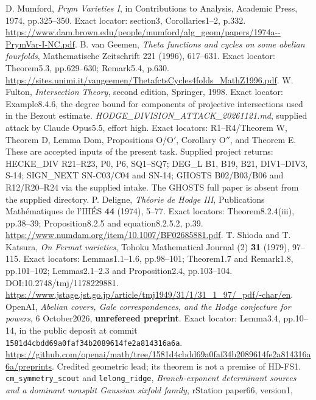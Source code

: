 D. Mumford, \emph{Prym Varieties I}, in Contributions to Analysis,
Academic Press, 1974, pp.325--350. Exact locator: section3,
Corollaries1--2, p.332.
\url{https://www.dam.brown.edu/people/mumford/alg_geom/papers/1974a--PrymVar-I-NC.pdf}.
B. van Geemen, \emph{Theta functions and cycles on some abelian fourfolds},
Mathematische Zeitschrift 221 (1996), 617--631.
Exact locator: Theorem5.3, pp.629--630; Remark5.4, p.630.
\url{https://sites.unimi.it/vangeemen/ThetafctsCycles4folds_MathZ1996.pdf}.
W. Fulton, \emph{Intersection Theory}, second edition, Springer, 1998.
Exact locator: Example8.4.6, the degree bound for components of
projective intersections used in the Bezout estimate.
\emph{HODGE\_DIVISION\_ATTACK\_20261121.md}, supplied attack by
Claude Opus5.5, effort high. Exact locators: R1--R4/Theorem W,
Theorem D, Lemma Dom, Propositions O/O$'$, Corollary O$''$,
and Theorem E. These are accepted inputs of the present task.
Supplied project returns: HECKE\_DIV R21--R23, P0, P6, SQ1--SQ7;
DEG\_L B1, B19, B21, DIV1--DIV3, S-14;
SIGN\_NEXT SN-C03/C04 and SN-14;
GHOSTS B02/B03/B06 and R12/R20--R24 via the supplied intake.
The GHOSTS full paper is absent from the supplied directory.
P. Deligne, \emph{Th\'eorie de Hodge III}, Publications
Math\'ematiques de l'IH\'ES \textbf{44} (1974), 5--77.
Exact locators: Theorem8.2.4(iii), pp.38--39;
Proposition8.2.5 and equation8.2.5.2, p.39.
\url{https://www.numdam.org/item/10.1007/BF02685881.pdf}.
T. Shioda and T. Katsura, \emph{On Fermat varieties}, Tohoku
Mathematical Journal (2) \textbf{31} (1979), 97--115.
Exact locators: Lemmas1.1--1.6, pp.98--101; Theorem1.7 and
Remark1.8, pp.101--102; Lemmas2.1--2.3 and Proposition2.4,
pp.103--104. DOI:10.2748/tmj/1178229881.
\url{https://www.jstage.jst.go.jp/article/tmj1949/31/1/31_1_97/_pdf/-char/en}.
OpenAI, \emph{Abelian covers, Gale correspondences, and the Hodge
conjecture for powers}, 6 October2026, \textbf{unrefereed preprint}.
Exact locator: Lemma3.4, pp.10--14, in the public deposit at commit
\texttt{1581d4cbdd69a0faf34b2089614fe2a814316a6a}.
\url{https://github.com/openai/math/tree/1581d4cbdd69a0faf34b2089614fe2a814316a6a/preprints}.
Credited geometric lead; its theorem is not a premise of HD-FS1.
\texttt{cm\_symmetry\_scout} and \texttt{lelong\_ridge},
\emph{Branch-exponent determinant sources and a dominant nonsplit
Gaussian sixfold family}, rStation paper66, version1,

